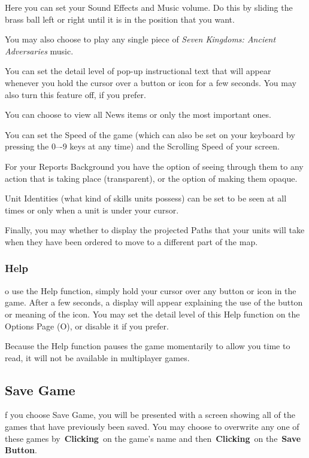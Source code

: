 Here you can set your Sound Effects and Music volume. Do this by sliding the brass ball left or right until it is in the position that you want.

You may also choose to play any single piece of \textit{Seven Kingdoms: Ancient Adversaries} music.

You can set the detail level of pop-up instructional text that will appear whenever you hold the cursor over a button or icon for a few seconds. You may also turn this feature off, if you prefer.

You can choose to view all News items or only the most important ones.

You can set the Speed of the game (which can also be set on your keyboard by pressing the 0–-9 keys at any time) and the Scrolling Speed of your screen.

For your Reports Background you have the option of seeing through them to any action that is taking place (transparent), or the option of making them opaque.

Unit Identities (what kind of skills units possess) can be set to be seen at all times or only when a unit is under your cursor.

Finally, you may whether to display the projected Paths that your units will take when they have been ordered to move to a different part of the map.

\subsubsection{Help}

o use the Help function, simply hold your cursor over any button or icon in the game. After a few seconds, a display will appear explaining the use of the button or meaning of the icon. You may set the detail level of this Help function on the Options Page (O), or disable it if you prefer.

Because the Help function pauses the game momentarily to allow you time to read, it will not be available in multiplayer games.

\subsection{Save Game}


f you choose Save Game, you will be presented with a screen showing all of the games that have previously been saved. You may choose to overwrite any one of these games by \textbf{Clicking} on the game’s name and then \textbf{Clicking} on the \textbf{Save Button}.

